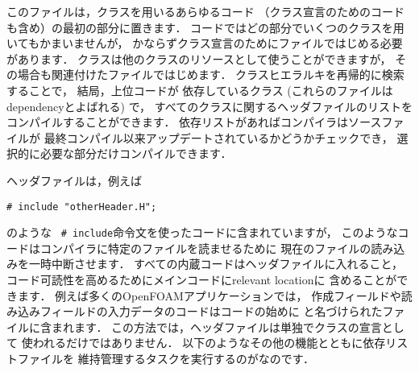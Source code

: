 このファイルは，クラスを用いるあらゆるコード
（クラス宣言のためのコードも含め）の最初の部分に置きます．
コードではどの部分でいくつのクラスを用いてもかまいませんが，
かならずクラス宣言のためにファイルではじめる必要があります．
クラスは他のクラスのリソースとして使うことができますが，
その場合も関連付けたファイルではじめます．
クラスヒエラルキを再帰的に検索することで，
結局，上位コードが
%
依存しているクラス
(これらのファイルはdependencyとよばれる) で，
すべてのクラスに関するヘッダファイルのリストを
コンパイルすることができます．
%
依存リストがあればコンパイラはソースファイルが
最終コンパイル以来アップデートされているかどうかチェックでき，
選択的に必要な部分だけコンパイルできます．

ヘッダファイルは，例えば
\begin{OFcode}
\begin{verbatim}
# include "otherHeader.H";
\end{verbatim}
\end{OFcode}
のような\ 
%
%
\verb|# include|命令文を使ったコードに含まれていますが，
このようなコードはコンパイラに特定のファイルを読ませるために
現在のファイルの読み込みを一時中断させます．
すべての内蔵コードはヘッダファイルに入れること，
コード可読性を高めるためにメインコードにrelevant locationに
含めることができます．
例えば多くのOpenFOAMアプリケーションでは，
作成フィールドや読み込みフィールドの入力データのコードはコードの始めに
と名づけられたファイルに含まれます．
この方法では，ヘッダファイルは単独でクラスの宣言として
使われるだけではありません．
以下のようなその他の機能とともに依存リストファイルを
維持管理するタスクを実行するのがなのです．
